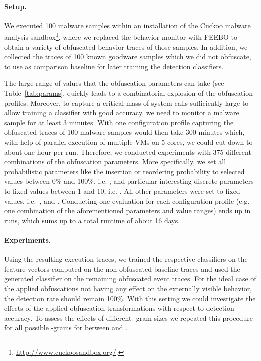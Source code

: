 \documentclass{llncs}
\begin{document}
\paragraph{Setup.}
We executed 100 malware samples within an installation of the Cuckoo malware analysis sandbox\footnote{\url{http://www.cuckoosandbox.org/}.}, where we replaced the behavior monitor with FEEBO to obtain a variety of obfuscated behavior traces of those samples. In addition, we collected the traces of 100 known goodware samples which we did not obfuscate, to use as comparison baseline for later training the detection classifiers. 

The large range of values that the obfuscation parameters can take (see Table~\ref{tab:params}, quickly leads to a combinatorial explosion of the obfuscation profiles. Moreover, to capture a critical mass of system calls sufficiently large to allow training a classifier with good accuracy, we need to monitor a malware sample for at least 3 minutes. With one configuration profile capturing the obfuscated traces of 100 malware samples would then take 300 minutes which, with help of parallel execution of multiple VMs on 5 cores, we could cut down to about one hour per run. Therefore, we conducted experiments with 375 different combinations of the obfuscation parameters. More specifically, we set all probabilistic parameters like the insertion or reordering probability to selected values between 0\% and 100\%, i.e. , and particular interesting discrete parameters to fixed values between 1 and 10, i.e. . All other parameters were set to fixed values, i.e.~,  and . 
Conducting one evaluation for each configuration profile (e.g. one combination of the aforementioned parameters and value ranges) ends up in  runs, which sums up to a total runtime of about 16 days. 

\paragraph{Experiments.}
Using the resulting execution traces, we trained the respective classifiers on the feature vectors computed on the non-obfuscated baseline traces and used the generated classifier on the remaining obfuscated event traces. For the ideal case of the applied obfuscations not having any effect on the externally visible behavior, the detection rate should remain 100\%.
With this setting we could investigate the effects of the applied obfuscation transformations with respect to detection accuracy. To assess the effects of different -gram sizes we repeated this procedure for all possible -grams for  between  and .
\end{document}
